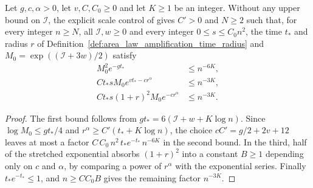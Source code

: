 \begin{lemma}
    \label{thm:area_law_amplification_scale_bounds}
    \leanok
    Let $g,c,\alpha>0$, let $v,C,C_0\ge0$ and let $K\ge1$ be an integer.
    Without any upper bound on $\mathcal I$, the explicit scale control of
    \cite[Proposition~10.2]{OpenAI2026AreaLaw} gives $C'>0$ and $N\ge2$ such
    that, for every integer $n\ge N$, all
    $\mathcal I,w\ge0$ and every integer $0\le s\le C_0n^2$, the time
    $t_*$ and radius $r$ of
    Definition~\ref{def:area_law_amplification_time_radius} and
    $M_0=\exp((\mathcal I+3w)/2)$ satisfy
    \begin{align*}
        M_0^2e^{-gt_*}                & \le n^{-6K}, \\
        Ct_*sM_0e^{vt_*-cr^\alpha}    & \le n^{-3K}, \\
        Ct_*s(1+r)^2M_0e^{-cr^\alpha} & \le n^{-3K}.
    \end{align*}
\end{lemma}
\begin{proof}
    \leanok
    The first bound follows from $gt_*=6(\mathcal I+w+K\log n)$. Since
    $\log M_0\le gt_*/4$ and $r^\alpha\ge C'(t_*+K\log n)$, the choice
    $cC'=g/2+2v+12$ leaves at most a factor
    $C\,C_0\,n^2\,t_*e^{-t_*}\,n^{-6K}$ in the second bound. In the third,
    half of the stretched exponential absorbs $(1+r)^2$ into a constant
    $B\ge1$ depending only on $c$ and $\alpha$, by comparing a power of
    $r^\alpha$ with the exponential series. Finally $t_*e^{-t_*}\le1$, and
    $n\ge CC_0B$ gives the remaining factor $n^{-3K}$.
\end{proof}

